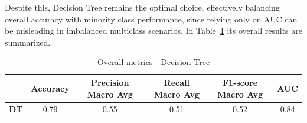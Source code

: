 Despite this, Decision Tree remains the optimal choice, effectively balancing overall accuracy with minority class performance, 
since relying only on AUC can be misleading in imbalanced multiclass scenarios.
In Table~\ref{tab:best_model_multiclass_classification} its overall results are summarized.
\begin{table}[H]
    \centering
    \begin{tabular}{cccccc}
        \toprule
        \bf{ } & \bf{Accuracy} & \bf{Precision Macro Avg} & \bf{Recall Macro Avg} & \bf{F1-score Macro Avg} & \bf{AUC} \\
        \midrule
        \bf{DT} & 0.79 & 0.55 & 0.51 & 0.52 & 0.84 \\
        \bottomrule
    \end{tabular}
    \caption{Overall metrics - Decision Tree}
    \label{tab:best_model_multiclass_classification}
\end{table}


 






